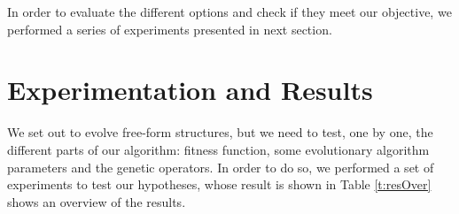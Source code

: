 \documentclass[runningheads,a4paper]{llncs}
\begin{document}


In order to evaluate the different options and check if they meet our
objective, we performed a series of experiments presented in next
section. 

\section{Experimentation and Results}\label{ch:res}

We set out to evolve free-form structures, but we need to test, one by
one, the different parts of our algorithm: fitness function, some
evolutionary algorithm parameters and the genetic operators. In order
to do so, we performed a set of experiments to test our hypotheses,
whose result is shown in Table \ref{t:resOver} shows an overview of the results. 
\end{document}
